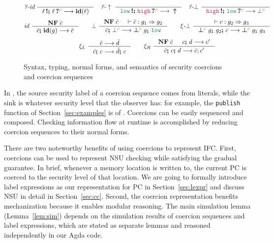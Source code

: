 \begin{figure}[tbp]
  {\small
  \begin{gather*}
  \textit{?-id}~
  \inference{}
            {\inj{\ell} \seq \proj{\ell}{p} \longrightarrow \id{\ell}}
  \quad
  \textit{?-}\uparrow~
  \inference{}
            {\inj{\low} \seq \proj{\high}{p} \longrightarrow \;\;\up}
  \quad
  \textit{?-}\bot~
  \inference{}
            {\inj{\high} \seq \proj{\low}{p} \longrightarrow \bot^{\bl{p}}}
  \end{gather*}}
  {\small
  \begin{gather*}
  \textit{id}~
  \inference{\mathbf{NF}\; \bar{c}}
            {\bar{c} \seq \id{g} \longrightarrow \bar{c}}
  \qquad
  \bot~
  \inference{\mathbf{NF}\; \bar{c} & \vdash \bar{c} : g_1 \Rightarrow g_2}
            {\bar{c} \seq \bot^{\bl{p}} \longrightarrow \err{g_1}{\low}{p} }
  \qquad
  \xi\textit{-}\bot~
  \inference{\vdash c : g_2 \Rightarrow g_3}
    {\err{g_1}{g_2}{p} \seq c \longrightarrow \err{g_1}{g_3}{p}}
  \\[1ex]
  \xi_L~
  \inference{\bar{c} \longrightarrow \bar{d}}{\bar{c} \seq c \longrightarrow \bar{d} \seq c}
  \qquad
  \xi_R~
  \inference{\mathbf{NF}\; \bar{c} & c \seq d \longrightarrow c'}
            {\bar{c} \seq c \seq d \longrightarrow \bar{c}; c'}
  \end{gather*}}
  \caption{Syntax, typing, normal forms, and semantics of security coercions and coercion sequences}
  \label{fig:cexpr}
\end{figure}

In \Surface, the source security label of a coercion sequence comes from
literals, while the sink is whatever security level that the observer has: for
example, the \texttt{publish} function of Section~\ref{sec:examples} is of \low.
Coercions can be easily sequenced and composed. Checking information flow at
runtime is accomplished by reducing coercion sequences to their normal forms.

There are two noteworthy benefits of using coercions to represent IFC. First,
coercions can be used to represent NSU checking while satisfying the gradual
guarantee. In brief, whenever a memory location is written to, the current PC is
coerced to the security level of that location. We are going to formally
introduce label expressions as our representation for PC in
Section~\ref{sec:lexpr} and discuss NSU in detail in Section~\ref{sec:cc}.
Second, the coercion representation benefits mechanization because it enables
modular reasoning. The main simulation lemma (Lemma~\ref{lem:sim}) depends on
the simulation results of coercion sequences and label expressions, which are
stated as separate lemmas and reasoned independently in our Agda code.

